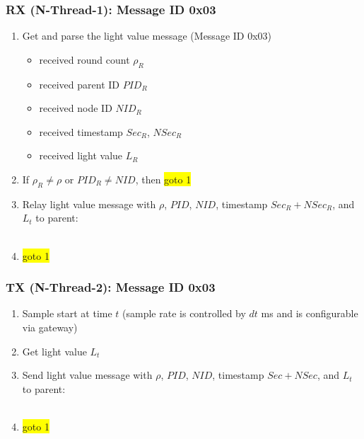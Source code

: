 \documentclass[letterpaper,9pt]{article}
\begin{document}
\subsubsection{RX (N-Thread-1): Message ID 0x03}

\begin{enumerate}
	\item Get and parse the light value message (Message ID 0x03)
	\begin{itemize}
		\item received round count $\rho_R$
		\item received parent ID $PID_R$
		\item received node ID $NID_R$
		\item received timestamp $Sec_R$, $NSec_R$
		\item received light value $L_R$
	\end{itemize}
		\item If $\rho_R \neq \rho$ or $PID_R \neq NID$, then \colorbox{yellow}{goto 1}
		\item Relay light value message with $\rho$, $PID$, $NID$, timestamp $Sec_R+NSec_R$, and $L_t$ to parent:\\
		\\
	\item \colorbox{yellow}{goto 1}
\end{enumerate}

\subsubsection{TX (N-Thread-2): Message ID 0x03}

\begin{enumerate}
	\item Sample start at time $t$ (sample rate is controlled by $dt$ ms and is configurable via gateway)
	\item Get light value $L_t$
		\item Send light value message with $\rho$, $PID$, $NID$, timestamp $Sec+NSec$, and $L_t$ to parent:\\
		\\
	\item \colorbox{yellow}{goto 1}
\end{enumerate}
\end{document}
